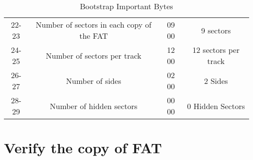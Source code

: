 \documentclass{article}
\begin{document}
\begin{table}[h]
\begin{tabular}{|c|c|c|c|}
                22-23 & Number of sectors in each copy of the FAT &
                    09 00 &
                    9 sectors \\
                24-25 & Number of sectors per track &
                    12 00 &
                    12 sectors per track\\
                26-27 & Number of sides &
                    02 00 &
                    2 Sides \\
                28-29 & Number of hidden sectors &
                    00 00 &
                    0 Hidden Sectors \\
            \hline
    \end{tabular}
    \caption{Bootstrap Important Bytes}
    \label{tab:basic}
    \end{table}

    \section{Verify the copy of FAT}\label{sec:verifyfat}
\end{document}

